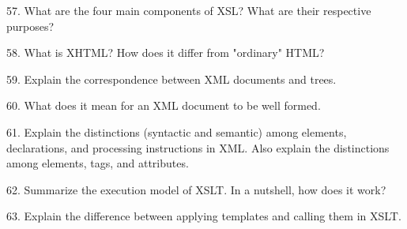 57. What are the four main components of XSL? What are their respective purposes?

\filbreak
\vskip 1cm

58. What is XHTML? How does it differ from "ordinary" HTML?

\filbreak
\vskip 1cm

59. Explain the correspondence between XML documents and trees.

\filbreak
\vskip 1cm

60. What does it mean for an XML document to be well formed.

\filbreak
\vskip 1cm

61. Explain the distinctions (syntactic and semantic) among elements, declarations, and processing instructions in XML. Also explain the distinctions among elements, tags, and attributes.

\filbreak
\vskip 1cm

62. Summarize the execution model of XSLT. In a nutshell, how does it work?

\filbreak
\vskip 1cm

63. Explain the difference between applying templates and calling them in XSLT.

\filbreak
\vfill\eject
\bye
